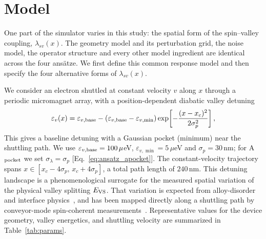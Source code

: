 \documentclass[aip,jap,reprint,superscriptaddress,longbibliography,floatfix]{revtex4-2}
\begin{document}
\section{Model}
\label{sec:model}

One part of the simulator varies in this study: the spatial form of the
spin--valley coupling, $\lambda_{sv}(x)$. The geometry model and its
perturbation grid, the noise model, the operator structure and every other
model ingredient are identical across the four ans\"atze. We first define
this common response model and then specify the four alternative forms of
$\lambda_{sv}(x)$.

We consider an electron shuttled at constant velocity $v$ along $x$
through a periodic micromagnet array, with a position-dependent
diabatic valley detuning
%
\begin{equation}
\varepsilon_v(x)=\varepsilon_{v,\rm base}-\left(\varepsilon_{v,\rm base}-\varepsilon_{v,\min}\right)
\exp\!\left[-\frac{(x-x_c)^2}{2\sigma_p^2}\right],
\label{eq:evx}
\end{equation}
%
This gives a baseline detuning with a Gaussian pocket (minimum) near the
shuttling path. We use $\varepsilon_{v,\rm base}=100\,\mu$eV,
$\varepsilon_{v,\min}=5\,\mu$eV and $\sigma_p=30$\,nm; for
A$_{\rm pocket}$ we set $\sigma_\lambda=\sigma_p$ [Eq.~\eqref{eq:ansatz_apocket}]. The constant-velocity trajectory spans
$x\in[x_c-4\sigma_p,\,x_c+4\sigma_p]$, a total path length of
$240$\,nm. This detuning landscape is a phenomenological surrogate for
the measured spatial variation of the physical valley splitting
$E_{\rm VS}$. That variation is expected from alloy-disorder and interface
physics~\cite{langrock_blueprint_2023,paquelet_wuetz_atomic_2022,losert_practical_2023},
and has been mapped directly along a shuttling path by conveyor-mode
spin-coherent measurements~\cite{volmer_mapping_2024}. Representative values for the
device geometry, valley energetics, and shuttling velocity are
summarized in Table~\ref{tab:params}.
\end{document}

